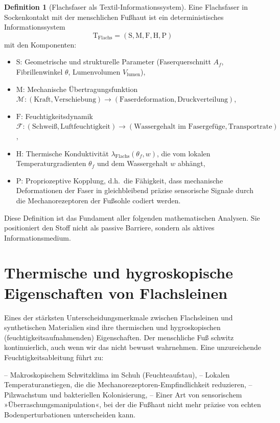 \documentclass[a4paper,12pt]{article}
\theoremstyle{definition}
\newtheorem{definition}{Definition}
\begin{document}
\begin{definition}[Flachsfaser als Textil-Informationssystem]
Eine Flachsfaser in Sockenkontakt mit der menschlichen Fußhaut ist ein deterministisches Informationssystem
\[
\text{T}_{\text{Flachs}} = (\text{S}, \text{M}, \text{F}, \text{H}, \text{P})
\]
mit den Komponenten:
\begin{itemize}
    \item[-] $\text{S}$: Geometrische und strukturelle Parameter (Faserquerschnitt $A_f$, Fibrillenwinkel $\theta$, Lumenvolumen $V_{\text{lumen}}$),
    \item[-] $\text{M}$: Mechanische Übertragungsfunktion $\mathcal{M}: (\text{Kraft}, \text{Verschiebung}) \to (\text{Faserdeformation}, \text{Druckverteilung})$,
    \item[-] $\text{F}$: Feuchtigkeitsdynamik $\mathcal{F}: (\text{Schweiß}, \text{Luftfeuchtigkeit}) \to (\text{Wassergehalt im Fasergefüge}, \text{Transportrate})$,
    \item[-] $\text{H}$: Thermische Konduktivität $\lambda_{\text{Flachs}}(\theta_f, w)$, die vom lokalen Temperaturgradienten $\theta_f$ und dem Wassergehalt $w$ abhängt,
    \item[-] $\text{P}$: Propriozeptive Kopplung, d.h.\ die Fähigkeit, dass mechanische Deformationen der Faser in gleichbleibend präzise sensorische Signale durch die Mechanorezeptoren der Fußsohle codiert werden.
\end{itemize}
\end{definition}

Diese Definition ist das Fundament aller folgenden mathematischen Analysen. Sie positioniert den Stoff nicht als passive Barriere, sondern als aktives Informationsmedium.

\section{Thermische und hygroskopische Eigenschaften von Flachsleinen}

Eines der stärksten Unterscheidungsmerkmale zwischen Flachsleinen und synthetischen Materialien sind ihre thermischen und hygroskopischen (feuchtigkeitsaufnahmenden) Eigenschaften. Der menschliche Fuß schwitz kontinuierlich, auch wenn wir das nicht bewusst wahrnehmen. Eine unzureichende Feuchtigkeitsableitung führt zu:

-- Makroskopischem Schwitzklima im Schuh (Feuchteaufstau),
-- Lokalen Temperaturanstiegen, die die Mechanorezeptoren-Empfindlichkeit reduzieren,
-- Pilzwachstum und bakteriellen Kolonisierung,
-- Einer Art von sensorischem »Überraschungsmanipulation«, bei der die Fußhaut nicht mehr präzise von echten Bodenperturbationen unterscheiden kann.
\end{document}
